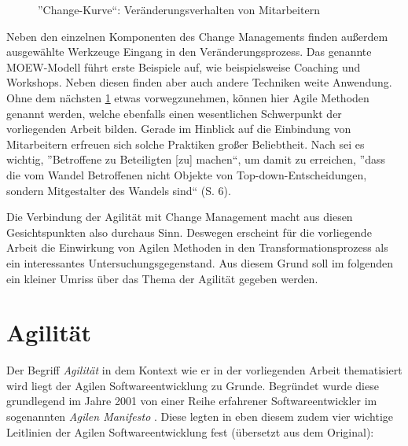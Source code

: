  \begin{figure}
	\centering
	\caption[Change-Kurve von Mitarbeiterverhalten]{''Change-Kurve``: Veränderungsverhalten von Mitarbeitern \protect \cite[S. 3]{bertagnolli_change_2018}}
	\label{fig:changekurve}
\end{figure}

Neben den einzelnen Komponenten des Change Managements finden außerdem ausgewählte Werkzeuge Eingang in den Veränderungsprozess. Das genannte MOEW-Modell führt erste Beispiele auf, wie beispielsweise Coaching und Workshops. Neben diesen finden aber auch andere Techniken weite Anwendung. Ohne dem nächsten \ref{background:agile} etwas vorwegzunehmen, können hier Agile Methoden genannt werden, welche ebenfalls einen wesentlichen Schwerpunkt der vorliegenden Arbeit bilden. Gerade im Hinblick auf die Einbindung von Mitarbeitern erfreuen sich solche Praktiken großer Beliebtheit. Nach  sei es wichtig, ''Betroffene zu Beteiligten [zu] machen``, um damit zu erreichen, ''dass die vom Wandel Betroffenen nicht Objekte von Top-down-Entscheidungen, sondern Mitgestalter des
Wandels sind`` (S. 6). 

Die Verbindung der Agilität mit Change Management macht aus diesen Gesichtspunkten also durchaus Sinn. Deswegen erscheint für die vorliegende Arbeit die Einwirkung von Agilen Methoden in den Transformationsprozess als ein interessantes Untersuchungsgegenstand. Aus diesem Grund soll im folgenden ein kleiner Umriss über das Thema der Agilität gegeben werden.

\section{Agilität}
\label{background:agile}

Der Begriff  \textit{Agilität} in dem Kontext wie er in der vorliegenden Arbeit thematisiert wird liegt der Agilen Softwareentwicklung zu Grunde. Begründet wurde diese grundlegend im Jahre 2001 von einer Reihe erfahrener Softwareentwickler im sogenannten \textit{Agilen Manifesto} \cite{beck_manifesto}. Diese legten in eben diesem zudem vier wichtige Leitlinien der Agilen Softwareentwicklung fest (übersetzt aus dem Original):

